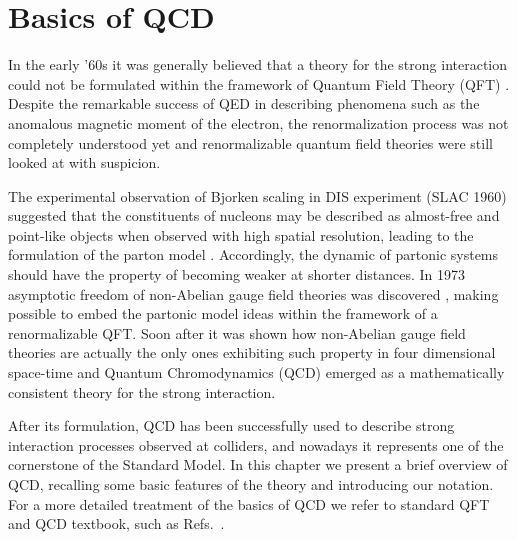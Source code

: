 \chapter{Basics of QCD}
In the early '60s it was generally believed that a theory for the strong interaction could not be formulated
within the framework of Quantum Field Theory (QFT) \cite{tHooft:1998qmr}.
Despite the remarkable success of QED in describing phenomena such as the anomalous magnetic moment of the electron,
the renormalization process was not completely understood yet and 
renormalizable quantum field theories were still looked at with suspicion.

%
The experimental observation of Bjorken scaling \cite{PhysRev.179.1547} in DIS experiment (SLAC 1960)
suggested that the constituents of nucleons may be described as almost-free and point-like objects 
when observed with high spatial resolution, leading to the formulation of the parton model \cite{PhysRevLett.23.1415}.
Accordingly, the dynamic of  partonic systems should have the property of becoming weaker at shorter distances. 
In 1973 asymptotic freedom of non-Abelian gauge field theories was discovered \cite{PhysRevLett.30.1346, PhysRevLett.30.1343},
making possible to embed the partonic model ideas within the framework of a renormalizable QFT.
%
Soon after it was shown how non-Abelian gauge field theories are actually the only ones exhibiting such property
in four dimensional space-time \cite{PhysRevLett.31.851} and Quantum Chromodynamics (QCD) emerged as a mathematically 
consistent theory for the strong interaction.  

%
After its formulation, QCD has been successfully used to describe strong interaction processes observed at colliders, and
nowadays it represents one of the cornerstone of the Standard Model. In this chapter we present
a brief overview of QCD, recalling some basic features of the theory and introducing our notation. 
For a more detailed treatment of the basics of QCD we refer to standard QFT and QCD textbook, such
as Refs.~\cite{Ellis:1991qj,Muta:2010xua,Collins:1984xc}.


